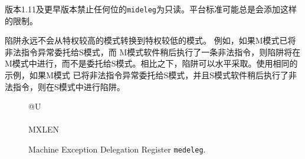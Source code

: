 \begin{commentary}
版本1.11及更早版本禁止任何位的{\tt mideleg}为只读。平台标准可能总是会添加这样的限制。
\end{commentary}

\iffalse
Traps never transition from a more-privileged mode to a less-privileged mode.
For example, if M-mode has delegated illegal instruction exceptions to S-mode, and
M-mode software later executes an illegal instruction, the trap is taken in
M-mode, rather than being delegated to S-mode.  By contrast, traps may be
taken horizontally.  Using the same example, if M-mode has delegated illegal
instruction exceptions to S-mode, and S-mode software later executes an illegal
instruction, the trap is taken in S-mode.

Delegated interrupts result in the interrupt being masked at the delegator
privilege level.  For example, if the supervisor timer interrupt (STI) is
delegated to S-mode by setting {\tt mideleg}[5], STIs will not be taken when
executing in M-mode.  By contrast, if {\tt mideleg}[5] is clear, STIs can
be taken in any mode and regardless of current mode will transfer control to
M-mode.
\fi

陷阱永远不会从特权较高的模式转换到特权较低的模式。 例如，如果M模式已将非法指令异常委托给S模式，而 M模式软件稍后执行了一条非法指令，则陷阱将在M模式中进行，而不是委托给S模式。相比之下，陷阱可以水平采取。使用相同的示例，如果M模式 已将非法指令异常委托给S模式，并且S模式软件稍后执行了非法指令，则在S模式中进行陷阱。

\begin{figure}[h!]
{\footnotesize
\begin{center}
\begin{tabular}{@{}U}
 \\
\hline
{} \\
\hline
MXLEN \\
\end{tabular}
\end{center}
}
\vspace{-0.1in}
\caption{Machine Exception Delegation Register {\tt medeleg}.}
\label{medelegreg}
\end{figure}

\iffalse
{\tt medeleg} has a bit position allocated for every synchronous exception
shown in Table~\ref{mcauses} on page~\pageref{mcauses}, with the index of the bit position equal to the
value returned in the {\tt mcause} register (i.e., setting bit 8 allows
user-mode environment calls to be delegated to a lower-privilege trap
handler).
\fi

